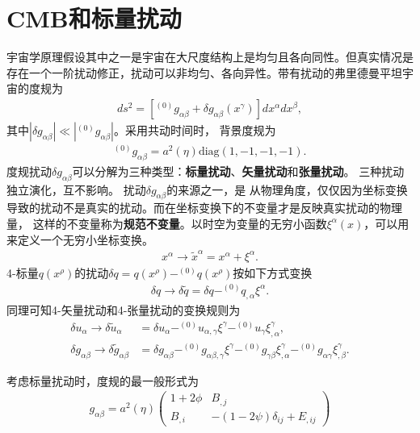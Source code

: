 \section{CMB和标量扰动}

宇宙学原理假设其中之一是宇宙在大尺度结构上是均匀且各向同性。但真实情况是存在一个一阶扰动修正，扰动可以非均匀、各向异性。带有扰动的弗里德曼平坦宇宙的度规为
\begin{align}
	\label{eq:perturbation-metric}
	ds^2=\left[^{(0)}g_{\alpha\beta}+\delta g_{\alpha\beta}(x^{\gamma})
	\right]dx^{\alpha}dx^{\beta},
\end{align}
其中$|\delta g_{\alpha\beta}|\ll|^{(0)}g_{\alpha\beta}|$。采用共动时间时，
背景度规为
\begin{align}
	\label{eq:background-metric}
	^{(0)}g_{\alpha\beta}=a^2(\eta)\text{diag}(1, -1, -1, -1).
\end{align}
度规扰动$\delta
	g_{\alpha\beta}$可以分解为三种类型：\textbf{标量扰动}、\textbf{矢量扰动}和\textbf{张量扰动}。
三种扰动独立演化，互不影响。
扰动$\delta g_{\alpha\beta}$的来源之一，是
从物理角度，仅仅因为坐标变换导致的扰动不是真实的扰动。而在坐标变换下的不变量才是反映真实扰动的物理量，
这样的不变量称为\textbf{规范不变量}。以时空为变量的无穷小函数$\xi^{\alpha}(x)$，可以用来定义一个无穷小坐标变换。
\begin{align}
	\label{eq:coordinate-transformation}
	x^{\alpha} \rightarrow \tilde{x}^{\alpha}=x^{\alpha}+\xi^{\alpha}.
\end{align}
4-标量$q(x^{\rho})$的扰动$\delta
	q=q(x^{\rho})-^{(0)}q(x^{\rho})$按如下方式变换
\begin{align}
	\label{eq:scalar-perturbation-transformation}
	\delta q \rightarrow \delta\tilde{q}=\delta q
	-^{(0)}q_{,\alpha}\xi^{\alpha}.
\end{align}
同理可知4-矢量扰动和4-张量扰动的变换规则为
\begin{align}
	\label{eq:vector-perturbation-transformation}
	\delta u_{\alpha} \rightarrow \delta\tilde{u}_{\alpha}          & =
	\delta
	u_{\alpha}-^{(0)}u_{\alpha,\gamma}\xi^{\gamma}-^{(0)}u_{\gamma}\xi^{\gamma}_{,\alpha},
	\\
	\label{eq:tensor-perturbation-transformation}
	\delta g_{\alpha\beta}\rightarrow\delta \tilde{g}_{\alpha\beta} & =
	\delta g_{\alpha\beta}-^{(0)}g_{\alpha\beta,\gamma}\xi^{\gamma}
	-^{(0)}g_{\gamma\beta}\xi^{\gamma}_{,\alpha}-^{(0)}g_{\alpha\gamma}\xi^{\gamma}_{,\beta}.
\end{align}

考虑标量扰动时，度规的最一般形式为
\begin{align}
	\label{eq:scalar-metric-perturbation}
	g_{\alpha\beta}=a^2(\eta)
	\begin{pmatrix}
		1 + 2\phi & B_{,j}                        \\
		B_{,i}    & -(1-2\psi)\delta_{ij}+E_{,ij}
	\end{pmatrix}
\end{align}


